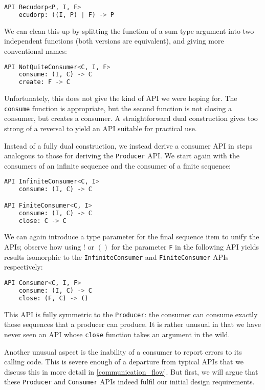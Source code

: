 \documentclass[sigplan,screen,10pt,anonymous,review]{acmart}
\begin{document}
\begin{lstlisting}[language=Python]
API Recudorp<P, I, F>
    ecudorp: ((I, P) | F) -> P
\end{lstlisting}

We can clean this up by splitting the function of a sum type argument into two independent functions (both versions are equivalent), and giving more conventional names:

\begin{lstlisting}[language=Python]
API NotQuiteConsumer<C, I, F>
    consume: (I, C) -> C
    create: F -> C
\end{lstlisting}

Unfortunately, this does not give the kind of API we were hoping for. The \texttt{consume} function is appropriate, but the second function is not closing a consumer, but creates a consumer. A straightforward dual construction gives too strong of a reversal to yield an API suitable for practical use.

Instead of a fully dual construction, we instead derive a consumer API in steps analogous to those for deriving the \texttt{Producer} API. We start again with the consumers of an infinite sequence and the consumer of a finite sequence:

\begin{lstlisting}[language=Python]
API InfiniteConsumer<C, I>
    consume: (I, C) -> C

API FiniteConsumer<C, I>
    consume: (I, C) -> C
    close: C -> C
\end{lstlisting}

We can again introduce a type parameter for the final sequence item to unify the APIs; observe how using $!$ or $()$ for the parameter \texttt{F} in the following API yields results isomorphic to the \texttt{InfiniteConsumer} and \texttt{FiniteConsumer} APIs respectively:

\begin{lstlisting}[language=Python]
API Consumer<C, I, F>
    consume: (I, C) -> C
    close: (F, C) -> ()
\end{lstlisting}

This API is fully symmetric to the \texttt{Producer}: the consumer can consume exactly those sequences that a producer can produce. It is rather unusual in that we have never seen an API whose \texttt{close} function takes an argument in the wild.

Another unusual aspect is the inability of a consumer to report errors to its calling code. This is severe enough of a departure from typical APIs that we discuss this in more detail in \cref{communication_flow}. But first, we will argue that these \texttt{Producer} and \texttt{Consumer} APIs indeed fulfil our initial design requirements.
\end{document}
